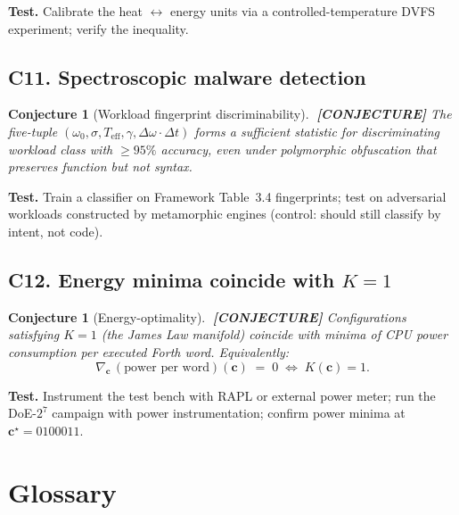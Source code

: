 \documentclass[11pt,letterpaper,openany]{book}
\theoremstyle{definition}
\theoremstyle{plain}
\newtheorem{openconjecture}[definition]{Conjecture}
\newcommand{\conjecture}{\textcolor{red!60!black}{\textbf{[CONJECTURE]}}\xspace}
\newcommand{\Teff}{T_{\mathrm{eff}}}
\begin{document}
\noindent\textbf{Test.} Calibrate the heat $\leftrightarrow$ energy units
via a controlled-temperature DVFS experiment; verify the inequality.

\section*{C11. Spectroscopic malware detection}

\begin{openconjecture}[Workload fingerprint discriminability]\label{conj:malware}
$\;$\conjecture
The five-tuple $(\omega_0, \sigma, \Teff, \gamma, \Delta\omega\cdot\Delta t)$
forms a sufficient statistic for discriminating workload class with
$\ge 95\%$ accuracy, even under polymorphic obfuscation that preserves
function but not syntax.
\end{openconjecture}

\noindent\textbf{Test.} Train a classifier on Framework Table~3.4
fingerprints; test on adversarial workloads constructed by metamorphic
engines (control: should still classify by intent, not code).

\section*{C12. Energy minima coincide with $K=1$}

\begin{openconjecture}[Energy-optimality]\label{conj:energy}
$\;$\conjecture
Configurations satisfying $K = 1$ (the James Law manifold) coincide with
minima of CPU power consumption per executed Forth word. Equivalently:
\[
  \nabla_{\mathbf{c}}\,(\text{power per word})(\mathbf{c}) \;=\; 0
  \;\iff\; K(\mathbf{c}) = 1.
\]
\end{openconjecture}

\noindent\textbf{Test.} Instrument the test bench with RAPL or external
power meter; run the DoE-$2^7$ campaign with power instrumentation;
confirm power minima at $\mathbf{c}^\star = 0100011$.

\chapter{Glossary}
\label{app:glossary}
\end{document}
